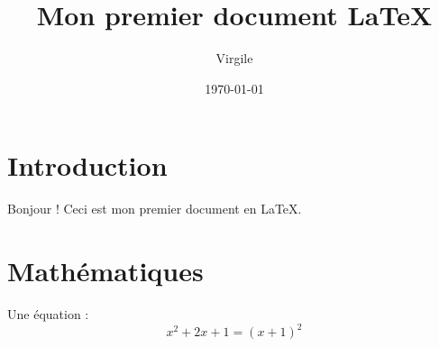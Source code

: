 \documentclass{article}
\title{Mon premier document LaTeX}
\author{Virgile}
\date{\today}
\begin{document}
 

\maketitle 

\section{Introduction} Bonjour ! Ceci est mon premier document en LaTeX. 

\section{Mathématiques} Une équation : \[ x^2 + 2x + 1 = (x+1)^2 \] 
\end{document}
